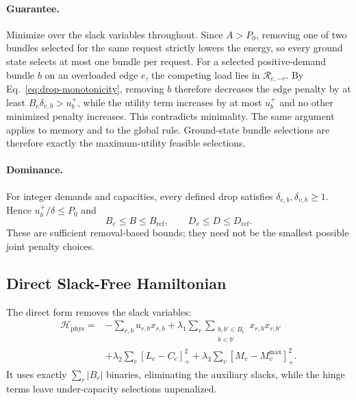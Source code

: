 \documentclass[twocolumn]{article}
\newcommand{\calH}{\mathcal{H}}
\begin{document}
\paragraph{Guarantee.}
Minimize over the slack variables throughout.  Since $A>P_0$,
removing one of two bundles selected for the same request strictly
lowers the energy, so every ground state selects at most one bundle
per request.  For a selected positive-demand bundle $b$ on an
overloaded edge $e$, the competing load lies in
$\mathcal R_{e,-r}$.  By Eq.~\eqref{eq:drop-monotonicity}, removing
$b$ therefore decreases the edge penalty by at least
$B_e\delta_{e,b}>u_b^+$, while the utility term increases by at most
$u_b^+$ and no other minimized penalty increases.  This contradicts
minimality.  The same argument applies to memory and to the global
rule.  Ground-state bundle selections are therefore exactly the
maximum-utility feasible selections.

\paragraph{Dominance.}
For integer demands and capacities, every defined drop satisfies
$\delta_{e,b},\delta_{v,b}\ge1$.  Hence $u_b^+/\delta\le P_0$ and
\begin{equation}
  B_e\le B\le B_{\mathrm{ref}},\qquad
  D_v\le D\le D_{\mathrm{ref}}.
\end{equation}
These are sufficient removal-based bounds; they need not be the
smallest possible joint penalty choices.

\subsection{Direct Slack-Free Hamiltonian}
\label{sec:direct}

The direct form removes the slack variables:
\begin{equation}
\begin{aligned}
  \calH_{\text{phys}}
  ={}&-\sum_{r,b}u_{r,b}x_{r,b}
  +\lambda_1\sum_r
    \sum_{\substack{b,b'\in B_r\\b<b'}}x_{r,b}x_{r,b'}\\
  &+\lambda_2\sum_e[L_e-C_e]_+^2
  +\lambda_3\sum_v[M_v-M_v^{\max}]_+^2.
\end{aligned}
\label{eq:direct-ham}
\end{equation}
It uses exactly $\sum_r |B_r|$ binaries, eliminating the auxiliary
slacks, while the hinge terms leave under-capacity selections
unpenalized.
\end{document}
